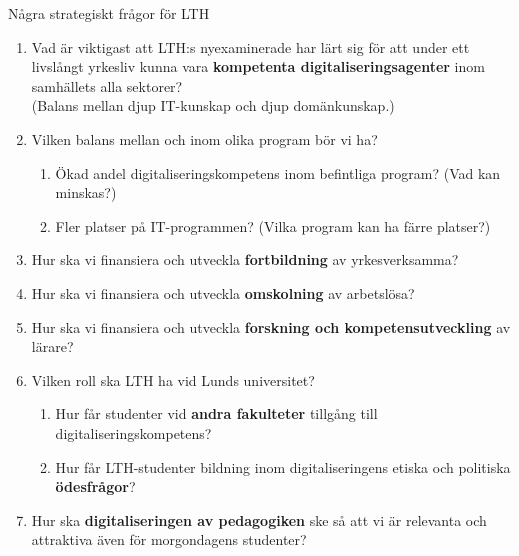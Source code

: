 \documentclass[aspectratio=169]{beamer}
\newenvironment{Slide}[1]%
  {\begin{frame}[environment=Slide]{#1}}
  {\end{frame}}%
\begin{document}
\begin{Slide}{Några strategiskt frågor för LTH}
  \begin{enumerate}\small
    \item Vad är viktigast att LTH:s nyexaminerade har lärt sig för att under ett livslångt yrkesliv kunna vara \textbf{kompetenta digitaliseringsagenter} inom samhällets alla sektorer? \\(Balans mellan djup IT-kunskap och djup domänkunskap.)
    \item Vilken balans mellan och inom olika program bör vi ha?
    \begin{enumerate}
      \item Ökad andel digitaliseringskompetens inom befintliga program? (Vad kan minskas?)
      \item Fler platser på IT-programmen? (Vilka program kan ha färre platser?)
    \end{enumerate}  
    \item Hur ska vi finansiera och utveckla \textbf{fortbildning} av yrkesverksamma?
    \item Hur ska vi finansiera och utveckla \textbf{omskolning} av arbetslösa?
    \item Hur ska vi finansiera och utveckla  \textbf{forskning och kompetensutveckling} av lärare?
    \item Vilken roll ska LTH ha vid Lunds universitet?
    \begin{enumerate}
      \item Hur får studenter vid \textbf{andra fakulteter} tillgång till digitaliseringskompetens?
      \item Hur får LTH-studenter bildning inom digitaliseringens etiska och politiska \textbf{ödesfrågor}?
    \end{enumerate}  
    \item Hur ska \textbf{digitaliseringen av pedagogiken} ske så att vi är relevanta och attraktiva även för morgondagens studenter?
  \end{enumerate}  
\end{Slide}
\end{document}
